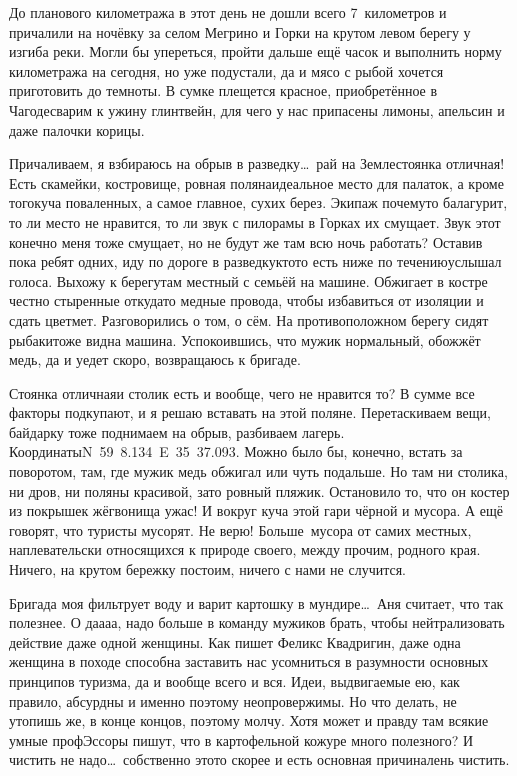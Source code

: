 До планового километража в этот день не дошли всего 7~километров и причалили на ночёвку за селом Мегрино и Горки на крутом левом берегу у изгиба реки. Могли бы упереться, пройти дальше ещё часок и выполнить норму километража на сегодня, но уже подустали, да и мясо с рыбой хочется приготовить до темноты. В сумке плещется красное, приобретённое в Чагоде\mdash сварим к ужину глинтвейн, для чего у нас припасены лимоны, апельсин и даже палочки корицы. 

Причаливаем, я взбираюсь на обрыв в разведку\ldots~рай на Земле\mdash стоянка отличная! Есть скамейки, костровище, ровная поляна\mdash идеальное место для палаток, а кроме того\mdash куча поваленных, а самое главное, сухих берез. Экипаж почему\sdash то балагурит, то ли место не нравится, то ли звук с пилорамы в Горках их смущает. Звук этот конечно меня тоже смущает, но не будут же там всю ночь работать? Оставив пока ребят одних, иду по дороге в разведку\mdash кто\sdash то есть ниже по течению\mdash услышал голоса. Выхожу к берегу\mdash там местный с семьёй на машине. Обжигает в костре честно стыренные откуда\sdash то медные провода, чтобы избавиться от изоляции и сдать цветмет. Разговорились о том, о сём. На противоположном берегу сидят рыбаки\mdash тоже видна машина. Успокоившись, что мужик нормальный, обожжёт медь, да и уедет скоро, возвращаюсь к бригаде. 

Стоянка отличная\mdash и столик есть и вообще, чего не нравится то? В сумме все факторы подкупают, и я решаю вставать на этой поляне. Перетаскиваем вещи, байдарку тоже поднимаем на обрыв, разбиваем лагерь. Координаты\mdash N~59\degree~8.134\textprime ~E~35\degree~37.093\textprime. Можно было бы, конечно, встать за поворотом, там, где мужик медь обжигал или чуть подальше. Но там ни столика, ни дров, ни поляны красивой, зато ровный пляжик. Остановило то, что он костер из покрышек жёг\mdash вонища ужас! И вокруг куча этой гари чёрной и мусора. А ещё говорят, что туристы мусорят. Не верю! Больше~мусора от самих местных, наплевательски относящихся к природе своего, между прочим, родного края. Ничего, на крутом бережку постоим, ничего с нами не случится.

Бригада моя фильтрует воду и варит картошку в мундире\ldots~Аня считает, что так полезнее. О да\sdash а\sdash а\sdash а, надо больше в команду мужиков брать, чтобы нейтрализовать действие даже одной женщины. Как пишет Феликс Квадригин, даже одна женщина в походе способна заставить нас усомниться в разумности основных принципов туризма, да и вообще всего и вся. Идеи, выдвигаемые ею, как правило, абсурдны и именно поэтому неопровержимы. Но что делать, не утопишь же, в конце концов, поэтому молчу. Хотя может и правду там всякие умные профЭссоры пишут, что в картофельной кожуре много полезного? И чистить не надо\ldots~собственно это\sdash то скорее и есть основная причина\mdash лень чистить.

